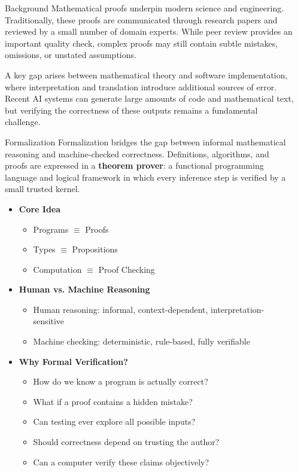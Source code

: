 \documentclass[final]{beamer}
\newlength{\sepwidth}
\newlength{\colwidth}
\newcommand{\separatorcolumn}{\begin{column}{\sepwidth}\end{column}}
\begin{document}
\begin{frame}[t]
\begin{columns}[t]
\separatorcolumn

\begin{column}{\colwidth}

\begin{alertblock}{Background}
Mathematical proofs underpin modern science and engineering. Traditionally,
these proofs are communicated through research papers and reviewed by a small
number of domain experts. While peer review provides an important quality check,
complex proofs may still contain subtle mistakes, omissions, or unstated assumptions.

A key gap arises between mathematical theory and software implementation, where
interpretation and translation introduce additional sources of error. Recent
AI systems can generate large amounts of code and mathematical text, but
verifying the correctness of these outputs remains a fundamental challenge.
\end{alertblock}

\begin{block}{Formalization}
Formalization bridges the gap between informal mathematical reasoning and
machine-checked correctness. Definitions, algorithms, and proofs are expressed
in a \textbf{theorem prover}: a functional programming language and logical
framework in which every inference step is verified by a small trusted kernel.

\begin{itemize}
    \item \textbf{Core Idea}
    \begin{itemize}
        \item Programs $\equiv$ Proofs
        \item Types $\equiv$ Propositions
        \item Computation $\equiv$ Proof Checking
    \end{itemize}

    \item \textbf{Human vs. Machine Reasoning}
    \begin{itemize}
        \item Human reasoning: informal, context-dependent, interpretation-sensitive
        \item Machine checking: deterministic, rule-based, fully verifiable
    \end{itemize}
  \item \textbf{Why Formal Verification?}
  \begin{itemize}
      \item How do we know a program is actually correct?
      \item What if a proof contains a hidden mistake?
      \item Can testing ever explore all possible inputs?
      \item Should correctness depend on trusting the author?
      \item Can a computer verify these claims objectively?
  \end{itemize}
\end{itemize}
\end{block}


\end{column}
\end{columns}
\end{frame}
\end{document}
